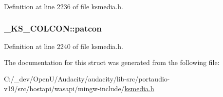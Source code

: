 Definition at line 2236 of file ksmedia.\+h.

\subsubsection[{\texorpdfstring{patcon}{patcon}}]{ \+\_\+\+K\+S\+\_\+\+C\+O\+L\+C\+O\+N\+::patcon}\hypertarget{struct___k_s___c_o_l_c_o_n_a3447a4044b21fa59ef422a12cb185d47}{}\label{struct___k_s___c_o_l_c_o_n_a3447a4044b21fa59ef422a12cb185d47}


Definition at line 2240 of file ksmedia.\+h.



The documentation for this struct was generated from the following file\+:\begin{DoxyCompactItemize}
\item 
C\+:/\+\_\+dev/\+Open\+U/\+Audacity/audacity/lib-\/src/portaudio-\/v19/src/hostapi/wasapi/mingw-\/include/\hyperlink{ksmedia_8h}{ksmedia.\+h}\end{DoxyCompactItemize}
